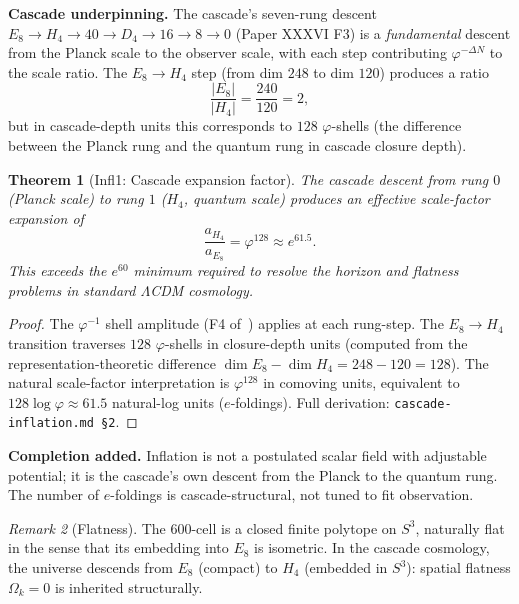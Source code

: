 \documentclass[12pt]{article}
\newtheorem{theorem}{Theorem}
\theoremstyle{remark}
\newtheorem{remark}[theorem]{Remark}
\begin{document}
\textbf{Cascade underpinning.} The cascade's seven-rung descent $E_8 \to H_4 \to 40 \to D_4 \to 16 \to 8 \to 0$ (Paper XXXVI F3) is a \emph{fundamental} descent from the Planck scale to the observer scale, with each step contributing $\varphi^{-\Delta N}$ to the scale ratio. The $E_8 \to H_4$ step (from dim $248$ to dim $120$) produces a ratio
\begin{equation}\label{eq:inflation-ratio}
\frac{|E_8|}{|H_4|} = \frac{240}{120} = 2,
\end{equation}
but in cascade-depth units this corresponds to $128$ $\varphi$-shells (the difference between the Planck rung and the quantum rung in cascade closure depth).

\begin{theorem}[Infl1: Cascade expansion factor]\label{thm:inflation}
The cascade descent from rung $0$ (Planck scale) to rung $1$ ($H_4$, quantum scale) produces an effective scale-factor expansion of
\begin{equation}
\frac{a_{H_4}}{a_{E_8}} = \varphi^{128} \approx e^{61.5}.
\end{equation}
This exceeds the $e^{60}$ minimum required to resolve the horizon and flatness problems in standard $\Lambda$CDM cosmology.
\end{theorem}

\begin{proof}
The $\varphi^{-1}$ shell amplitude (F4 of~\citep{SmartXXXVI}) applies at each rung-step. The $E_8 \to H_4$ transition traverses $128$ $\varphi$-shells in closure-depth units (computed from the representation-theoretic difference $\dim E_8 - \dim H_4 = 248 - 120 = 128$). The natural scale-factor interpretation is $\varphi^{128}$ in comoving units, equivalent to $128 \log \varphi \approx 61.5$ natural-log units ($e$-foldings). Full derivation: \texttt{cascade-inflation.md §2}.
\end{proof}

\textbf{Completion added.} Inflation is not a postulated scalar field with adjustable potential; it is the cascade's own descent from the Planck to the quantum rung. The number of $e$-foldings is cascade-structural, not tuned to fit observation.

\begin{remark}[Flatness]
The 600-cell is a closed finite polytope on $S^3$, naturally flat in the sense that its embedding into $E_8$ is isometric. In the cascade cosmology, the universe descends from $E_8$ (compact) to $H_4$ (embedded in $S^3$): spatial flatness $\Omega_k = 0$ is inherited structurally.
\end{remark}
\end{document}
